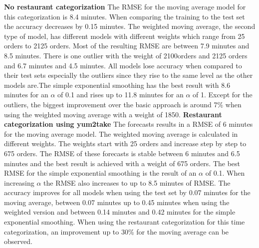 \newline\newline\textbf{No restaurant categorization}\newline
The RMSE for the moving average model for this categorization is 8.4 minutes. When comparing the training to the test set the accuracy decreases by 0.15 minutes. The weighted moving average, the second type of model, has different models with different weights which range from 25 orders to 2125 orders. Most of the resulting RMSE are between 7.9 minutes and 8.5 minutes. There is one outlier with the weight of 2100orders and 2125 orders and 6.7 minutes and 4.5 minutes. All models lose accuracy when compared to their test sets especially the outliers since they rise to the same level as the other models are.\newline The simple exponential smoothing has the best result with 8.6 minutes for an $\alpha$ of 0.1 and rises up to 11.8 minutes for an $\alpha$ of 1.
Except for the outliers, the biggest improvement over the basic approach is around 7\% when using the weighted moving average with a weight of 1850.
\newline\newline\textbf{Restaurant categorization using yum2take}\newline
The forecasts results in a RMSE of 6 minutes for the moving average model. The weighted moving average is calculated in different weights. The weights start with 25 orders and increase step by step to 675 orders. The RMSE of these forecasts is stable between 6 minutes and 6.5 minutes and the best result is achieved with a weight of 675 orders. The best RMSE for the simple exponential smoothing is the result of an $\alpha$ of 0.1. When increasing $\alpha$ the RMSE also increases to up to 8.5 minutes of RMSE. The accuracy improves for all models when using the test set by 0.07 minutes for the moving average, between 0.07 minutes up to 0.45 minutes when using the weighted version and between 0.14 minutes and 0.42 minutes for the simple exponential smoothing.\newline
When using the restaurant categorization for this time categorization, an improvement up to 30\% for the moving average can be observed.
